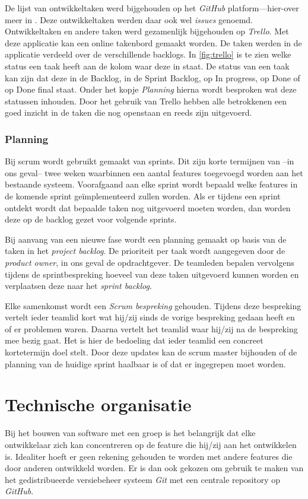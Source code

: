 De lijst van ontwikkeltaken werd bijgehouden op het \emph{GitHub} platform—{hier-over} meer in . Deze ontwikkeltaken werden daar ook wel \emph{issues} genoemd. Ontwikkeltaken en andere taken werd gezamenlijk bijgehouden op \emph{Trello}. Met deze applicatie kan een online takenbord gemaakt worden. De taken werden in de applicatie verdeeld over de verschillende backlogs. In \autoref{fig:trello} is te zien welke status een taak heeft aan de kolom waar deze in staat. De status van een taak kan zijn dat deze in de Backlog, in de Sprint Backlog, op In progress, op Done of op Done final staat. Onder het kopje \emph{Planning} hierna wordt besproken wat deze statussen inhouden. Door het gebruik van Trello hebben alle betrokkenen een goed inzicht in de taken die nog openstaan en reeds zijn uitgevoerd.

\subsubsection{Planning}
Bij scrum wordt gebruikt gemaakt van sprints. Dit zijn korte termijnen van --in ons geval-- twee weken waarbinnen een aantal features toegevoegd worden aan het bestaande systeem. Voorafgaand aan elke sprint wordt bepaald welke features in de komende sprint geïmplementeerd zullen worden. Als er tijdens een sprint ontdekt wordt dat bepaalde taken nog uitgevoerd moeten worden, dan worden deze op de backlog gezet voor volgende sprints.

Bij aanvang van een nieuwe fase wordt een planning gemaakt op basis van de taken in het \emph{project backlog}. De prioriteit per taak wordt aangegeven door de \emph{product owner}, in ons geval de opdrachtgever. De teamleden bepalen vervolgens tijdens de sprintbespreking hoeveel van deze taken uitgevoerd kunnen worden en verplaatsen deze naar het \emph{sprint backlog}. 

Elke samenkomst wordt een \emph{Scrum bespreking} gehouden. Tijdens deze bespreking vertelt ieder teamlid kort wat hij/zij sinds de vorige bespreking gedaan heeft en of er problemen waren. Daarna vertelt het teamlid waar hij/zij na de bespreking mee bezig gaat. Het is hier de bedoeling dat ieder teamlid een concreet kortetermijn doel stelt. Door deze updates kan de scrum master bijhouden of de planning van de huidige sprint haalbaar is of dat er ingegrepen moet worden.

\section{Technische organisatie} \label{sec:technische_organisatie}
Bij het bouwen van software met een groep is het belangrijk dat elke ontwikkelaar zich kan concentreren op de feature die hij/zij aan het ontwikkelen is. Idealiter hoeft er geen rekening gehouden te worden met andere features die door anderen ontwikkeld worden. Er is dan ook gekozen om gebruik te maken van het gedistribueerde versiebeheer systeem \emph{Git} met een centrale repository op \emph{GitHub}.

